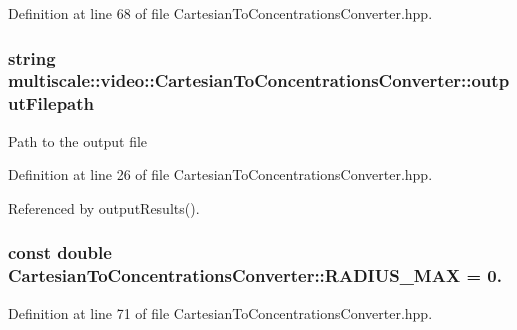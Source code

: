 \-Definition at line 68 of file \-Cartesian\-To\-Concentrations\-Converter.\-hpp.

\hypertarget{classmultiscale_1_1video_1_1CartesianToConcentrationsConverter_a9215448e33876a581b206a89b6651fd0}{
\subsubsection[{output\-Filepath}]{\setlength{\rightskip}{0pt plus 5cm}string {\bf multiscale\-::video\-::\-Cartesian\-To\-Concentrations\-Converter\-::output\-Filepath}}}\label{classmultiscale_1_1video_1_1CartesianToConcentrationsConverter_a9215448e33876a581b206a89b6651fd0}
\-Path to the output file 

\-Definition at line 26 of file \-Cartesian\-To\-Concentrations\-Converter.\-hpp.



\-Referenced by output\-Results().

\hypertarget{classmultiscale_1_1video_1_1CartesianToConcentrationsConverter_a2e14aa1021a91a2f1df2bd4904a2ca2f}{
\subsubsection[{\-R\-A\-D\-I\-U\-S\-\_\-\-M\-A\-X}]{\setlength{\rightskip}{0pt plus 5cm}const double {\bf \-Cartesian\-To\-Concentrations\-Converter\-::\-R\-A\-D\-I\-U\-S\-\_\-\-M\-A\-X} = 0.}}\label{classmultiscale_1_1video_1_1CartesianToConcentrationsConverter_a2e14aa1021a91a2f1df2bd4904a2ca2f}


\-Definition at line 71 of file \-Cartesian\-To\-Concentrations\-Converter.\-hpp.

